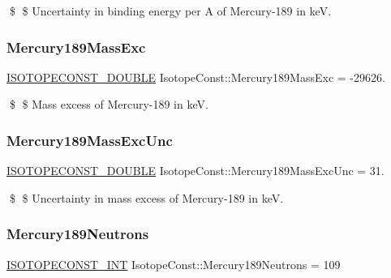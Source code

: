 \$ \$ Uncertainty in binding energy per A of Mercury-\/189 in keV. \mbox{\label{group___isotope_const-_mercury-_hg189_ga023c49ecb92d35f83531bde2c51eebc7}} 
\subsubsection{\texorpdfstring{Mercury189\+Mass\+Exc}{Mercury189MassExc}}
{\footnotesize\ttfamily \mbox{\hyperlink{group___isotope_const-_macros_ga8f45a7272ce02c0b4c65c44636ed719a}{I\+S\+O\+T\+O\+P\+E\+C\+O\+N\+S\+T\+\_\+\+D\+O\+U\+B\+LE}} Isotope\+Const\+::\+Mercury189\+Mass\+Exc = -\/29626.}

\$ \$ Mass excess of Mercury-\/189 in keV. \mbox{\label{group___isotope_const-_mercury-_hg189_ga37f12978eaaaece34e19a11bb544cd95}} 
\subsubsection{\texorpdfstring{Mercury189\+Mass\+Exc\+Unc}{Mercury189MassExcUnc}}
{\footnotesize\ttfamily \mbox{\hyperlink{group___isotope_const-_macros_ga8f45a7272ce02c0b4c65c44636ed719a}{I\+S\+O\+T\+O\+P\+E\+C\+O\+N\+S\+T\+\_\+\+D\+O\+U\+B\+LE}} Isotope\+Const\+::\+Mercury189\+Mass\+Exc\+Unc = 31.}

\$ \$ Uncertainty in mass excess of Mercury-\/189 in keV. \mbox{\label{group___isotope_const-_mercury-_hg189_gad30c3e6005cdd30a6ee342e3367905ae}} 
\subsubsection{\texorpdfstring{Mercury189\+Neutrons}{Mercury189Neutrons}}
{\footnotesize\ttfamily \mbox{\hyperlink{group___isotope_const-_macros_ga5f18360b3e99483a35c32d789e62621c}{I\+S\+O\+T\+O\+P\+E\+C\+O\+N\+S\+T\+\_\+\+I\+NT}} Isotope\+Const\+::\+Mercury189\+Neutrons = 109}

